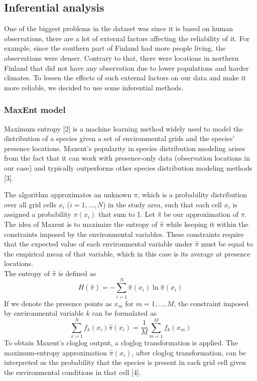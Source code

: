 \documentclass{article}
\begin{document}
\subsection{Inferential analysis}
One of the biggest problems in the dataset was since it is based on human observations, there are a lot of external factors affecting the reliability of it. For example, since the southern part of Finland had more people living, the observations were denser. Contrary to that, there were locations in northern Finland that did not have any observation due to lower populations and harder climates. To lessen the effects of such external factors on our data and make it more reliable, we decided to use some inferential methods.
\subsubsection{MaxEnt model}
Maximum entropy [2] is a machine learning method widely used to model the distribution of a species given a set of environmental grids and the species' presence locations. Maxent's popularity in species distribution modeling arises from the fact that it can work with presence-only data (observation locations in our case) and typically outperforms other species distribution modeling methods [3].
\par
The algorithm approximates an unknown $\pi$, which is a probability distribution over all grid cells $x_i$ ($i = 1,...,N$) in the study area, such that each cell $x_i$ is assigned a probability $\pi(x_i)$ that sum to 1. Let $\hat{\pi}$ be our approximation of $\pi$. The idea of Maxent is to maximize the entropy of $\hat{\pi}$ while keeping it within the constraints imposed by the environmental variables. These constraints require that the expected value of each environmental variable under $\hat{\pi}$ must be equal to the empirical mean of that variable, which in this case is its average at presence locations.
\\
The entropy of $\hat{\pi}$ is defined as
\begin{equation}
	H(\hat{\pi}) = - \sum_{i=1}^N\hat{\pi}(x_i) \ln \hat{\pi}(x_i)
\end{equation}
If we denote the presence points as $x_m$ for $m = 1,...,M$, the constraint imposed by environmental variable $k$ can be formulated as
\begin{equation}
	\sum_{x = 1}^Nf_k(x_i)\hat{\pi}(x_i) = \frac{1}{M}\sum_{m=1}^Mf_k(x_m)
\end{equation}
To obtain Maxent's cloglog output, a cloglog transformation is applied. The maximum-entropy approximation $\hat{\pi}(x_i)$, after cloglog transformation, can be interpreted as the probability that the species is present in each grid cell given the environmental conditions in that cell [4].
\end{document}
